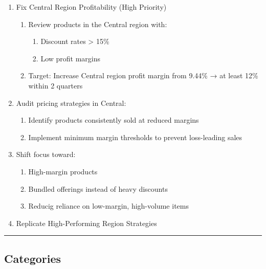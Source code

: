 \documentclass[
  letterpaper,
  DIV=11,
  numbers=noendperiod]{scrartcl}
\providecommand{\tightlist}{%
  \setlength{\itemsep}{0pt}\setlength{\parskip}{0pt}}
\begin{document}
\begin{enumerate}
\def\labelenumi{\arabic{enumi}.}
\item
  Fix Central Region Profitability (High Priority)

  \begin{enumerate}
  \def\labelenumii{\arabic{enumii}.}
  \tightlist
  \item
    Review products in the Central region with:

    \begin{enumerate}
    \def\labelenumiii{\arabic{enumiii}.}
    \tightlist
    \item
      Discount rates \textgreater{} 15\%
    \item
      Low profit margins
    \end{enumerate}
  \item
    Target: Increase Central region profit margin from 9.44\% → at least
    12\% within 2 quarters
  \end{enumerate}
\item
  Audit pricing strategies in Central:

  \begin{enumerate}
  \def\labelenumii{\arabic{enumii}.}
  \tightlist
  \item
    Identify products consistently sold at reduced margins
  \item
    Implement minimum margin thresholds to prevent loss-leading sales
  \end{enumerate}
\item
  Shift focus toward:

  \begin{enumerate}
  \def\labelenumii{\arabic{enumii}.}
  \tightlist
  \item
    High-margin products
  \item
    Bundled offerings instead of heavy discounts
  \item
    Reducig reliance on low-margin, high-volume items
  \end{enumerate}
\item
  Replicate High-Performing Region Strategies
\end{enumerate}

\begin{center}\rule{0.5\linewidth}{0.5pt}\end{center}

\subsection{Categories}\label{categories}
\end{document}
